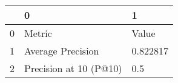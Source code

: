 \begin{tabular}{lll}
\toprule
{} &                       0 &         1 \\
\midrule
0 &                  Metric &     Value \\
1 &       Average Precision &  0.822817 \\
2 &  Precision at 10 (P@10) &       0.5 \\
\bottomrule
\end{tabular}
